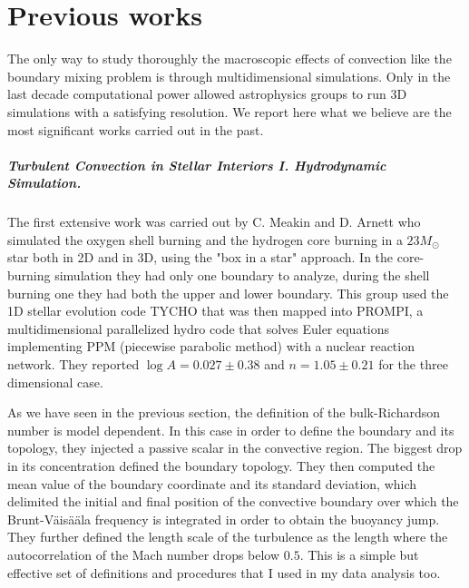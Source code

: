 
\chapter{Previous works}

The only way to study thoroughly the macroscopic effects of convection like the boundary mixing problem is through multidimensional simulations. Only in the last decade computational power allowed astrophysics groups to run 3D simulations with a satisfying resolution. We report here what we believe are the most significant works carried out in the past. 

\paragraph{Turbulent Convection in Stellar Interiors I. Hydrodynamic Simulation. \citet{meakin}} 
The first extensive work was carried out by C. Meakin and D. Arnett who simulated the oxygen shell burning and the hydrogen core burning in a $23 M_{\odot}$ star both in 2D and in 3D, using the "box in a star" approach. In the core-burning simulation they had only one boundary to analyze, during the shell burning one they had both the upper and lower boundary. This group used the 1D stellar evolution code TYCHO that was then mapped into PROMPI, a multidimensional parallelized hydro code that solves Euler equations implementing PPM (piecewise parabolic method) with a nuclear reaction network. They reported $\log A=0.027 \pm 0.38$ and $n=1.05 \pm 0.21$ for the three dimensional case. 

As we have seen in the previous section, the definition of the bulk-Richardson number is model dependent. In this case in order to define the boundary and its topology, they injected a passive scalar in the convective region. The biggest drop in its concentration defined the boundary topology. They then computed the mean value of the boundary coordinate and its standard deviation, which delimited the initial and final position of the convective boundary over which the Brunt-Väisääla frequency is integrated in order to obtain the buoyancy jump. They further defined the length scale of the turbulence as the length where the autocorrelation of the Mach number drops below $0.5$. This is a simple but effective set of definitions and procedures that I used in my data analysis too. 

